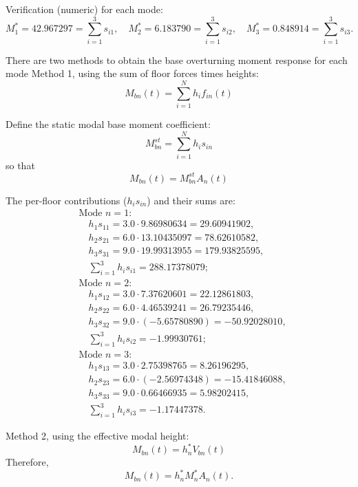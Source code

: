 \documentclass[11pt,a4paper]{article}
\begin{document}
Verification (numeric) for each mode:
\begin{equation}
M_1^*=42.967297=\sum_{i=1}^{3}s_{i1},\quad
M_2^*=6.183790=\sum_{i=1}^{3}s_{i2},\quad
M_3^*=0.848914=\sum_{i=1}^{3}s_{i3}.
\end{equation}

 There are two methods to obtain the base overturning moment response for each mode
Method 1, using the sum of floor forces times heights:
\begin{equation}
M_{bn}(t)=\sum_{i=1}^{N}h_if_{in}(t)
\end{equation}

Define the static modal base moment coefficient:
\begin{equation}
M_{bn}^{st}=\sum_{i=1}^{N}h_is_{in}
\end{equation}
so that
\begin{equation}
M_{bn}(t)=M_{bn}^{st}A_n(t)
\end{equation}

The per-floor contributions ($h_i s_{in}$) and their sums are:
\begin{equation}
\begin{aligned}
&\text{Mode }n=1:\\
&\quad h_1 s_{11}=3.0\cdot 9.86980634=29.60941902,\\
&\quad h_2 s_{21}=6.0\cdot 13.10435097=78.62610582,\\
&\quad h_3 s_{31}=9.0\cdot 19.99313955=179.93825595,\\
&\quad \sum_{i=1}^3 h_i s_{i1}=288.17378079;\\
&\text{Mode }n=2:\\
&\quad h_1 s_{12}=3.0\cdot 7.37620601=22.12861803,\\
&\quad h_2 s_{22}=6.0\cdot 4.46539241=26.79235446,\\
&\quad h_3 s_{32}=9.0\cdot(-5.65780890)=-50.92028010,\\
&\quad \sum_{i=1}^3 h_i s_{i2}=-1.99930761;\\
&\text{Mode }n=3:\\
&\quad h_1 s_{13}=3.0\cdot 2.75398765=8.26196295,\\
&\quad h_2 s_{23}=6.0\cdot(-2.56974348)=-15.41846088,\\
&\quad h_3 s_{33}=9.0\cdot 0.66466935=5.98202415,\\
&\quad \sum_{i=1}^3 h_i s_{i3}=-1.17447378.
\end{aligned}
\end{equation}

Method 2, using the effective modal height:
\begin{equation}
M_{bn}(t)=h_n^*V_{bn}(t)
\end{equation}
Therefore,
\begin{equation}
M_{bn}(t)=h_n^*M_n^*A_n(t).
\end{equation}
\end{document}
